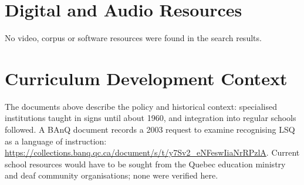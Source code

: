 \documentclass[12pt]{article}
\begin{document}
\section{Digital and Audio Resources}
No video, corpus or software resources were found in the search results.
\section{Curriculum Development Context}
The documents above describe the policy and historical context: specialised institutions taught in signs until about 1960, and integration into regular schools followed. A BAnQ document records a 2003 request to examine recognising LSQ as a language of instruction: \url{https://collections.banq.qc.ca/document/s/t/y7Sv2_eNFeswIiaNrRPzlA}. Current school resources would have to be sought from the Quebec education ministry and deaf community organisations; none were verified here.
\end{document}
